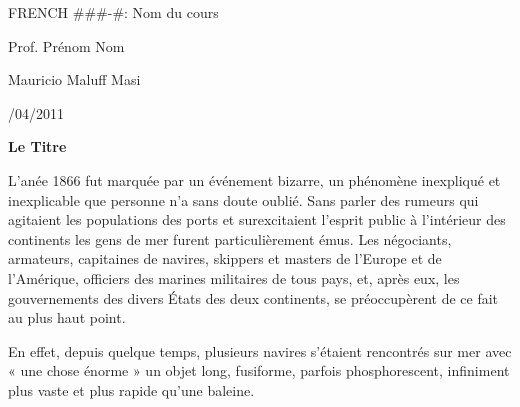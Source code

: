 \documentclass[letter,12pt]{article}
\begin{document}
\begin{spacing}{1}
\noindent FRENCH \#\#\#-\#: Nom du cours

\noindent Prof. Prénom Nom

\noindent Mauricio Maluff Masi

/04/2011 \\

\end{spacing}

{\centering
\textbf{Le Titre}

}

L'anée 1866 fut marquée par un événement bizarre, un phénomène inexpliqué et inexplicable que personne n’a sans doute oublié. Sans parler des rumeurs qui agitaient les populations des ports et surexcitaient l’esprit public à l’intérieur des continents les gens de mer furent particulièrement émus. Les négociants, armateurs, capitaines de navires, skippers et masters de l’Europe et de l’Amérique, officiers des marines militaires de tous pays, et, après eux, les gouvernements des divers États des deux continents, se préoccupèrent de ce fait au plus haut point.

En effet, depuis quelque temps, plusieurs navires s’étaient rencontrés sur mer avec « une chose énorme » un objet long, fusiforme, parfois phosphorescent, infiniment plus vaste et plus rapide qu’une baleine.
\end{document}
